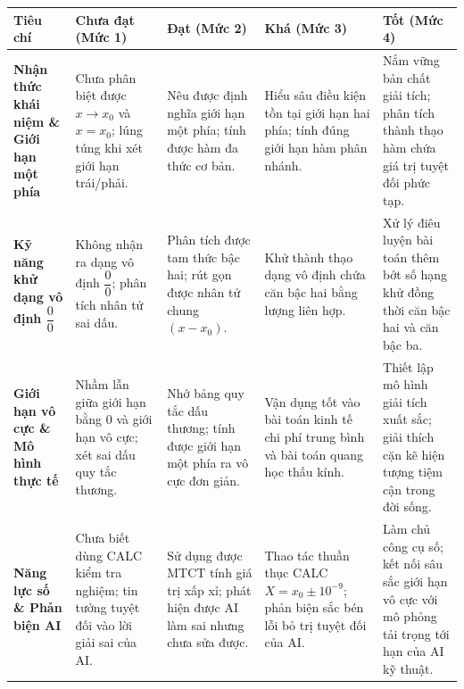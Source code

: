 \documentclass[12pt, a4paper]{article}
\begin{document}
\begin{center}
\small
\begin{tabularx}{\textwidth}{|p{2.8cm}|X|X|X|X|}
\hline
\textbf{Tiêu chí} & \textbf{Chưa đạt (Mức 1)} & \textbf{Đạt (Mức 2)} & \textbf{Khá (Mức 3)} & \textbf{Tốt (Mức 4)} \\ \hline
\textbf{Nhận thức khái niệm \& Giới hạn một phía} & Chưa phân biệt được $x \to x_0$ và $x = x_0$; lúng túng khi xét giới hạn trái/phải. & Nêu được định nghĩa giới hạn một phía; tính được hàm đa thức cơ bản. & Hiểu sâu điều kiện tồn tại giới hạn hai phía; tính đúng giới hạn hàm phân nhánh. & Nắm vững bản chất giải tích; phân tích thành thạo hàm chứa giá trị tuyệt đối phức tạp. \\ \hline
\textbf{Kỹ năng khử dạng vô định $\dfrac{0}{0}$} & Không nhận ra dạng vô định $\dfrac{0}{0}$; phân tích nhân tử sai dấu. & Phân tích được tam thức bậc hai; rút gọn được nhân tử chung $(x - x_0)$. & Khử thành thạo dạng vô định chứa căn bậc hai bằng lượng liên hợp. & Xử lý điêu luyện bài toán thêm bớt số hạng khử đồng thời căn bậc hai và căn bậc ba. \\ \hline
\textbf{Giới hạn vô cực \& Mô hình thực tế} & Nhầm lẫn giữa giới hạn bằng 0 và giới hạn vô cực; xét sai dấu quy tắc thương. & Nhớ bảng quy tắc dấu thương; tính được giới hạn một phía ra vô cực đơn giản. & Vận dụng tốt vào bài toán kinh tế chi phí trung bình và bài toán quang học thấu kính. & Thiết lập mô hình giải tích xuất sắc; giải thích cặn kẽ hiện tượng tiệm cận trong đời sống. \\ \hline
\textbf{Năng lực số \& Phản biện AI} & Chưa biết dùng CALC kiểm tra nghiệm; tin tưởng tuyệt đối vào lời giải sai của AI. & Sử dụng được MTCT tính giá trị xấp xỉ; phát hiện được AI làm sai nhưng chưa sửa được. & Thao tác thuần thục CALC $X = x_0 \pm 10^{-9}$; phản biện sắc bén lỗi bỏ trị tuyệt đối của AI. & Làm chủ công cụ số; kết nối sâu sắc giới hạn vô cực với mô phỏng tải trọng tới hạn của AI kỹ thuật. \\ \hline
\end{tabularx}
\end{center}
\end{document}
